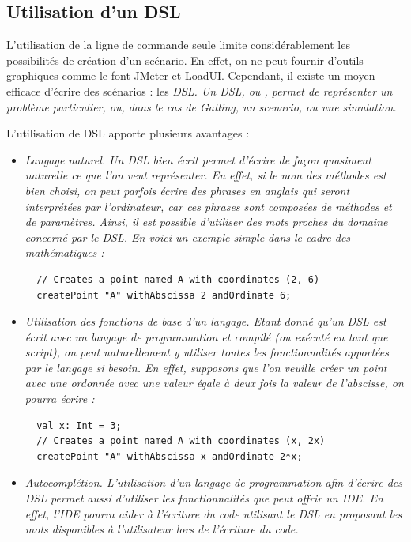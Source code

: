 \subsection{Utilisation d'un DSL}
L'utilisation de la ligne de commande seule limite considérablement les possibilités de création d'un scénario. En effet, on ne peut fournir d'outils graphiques comme le font JMeter et LoadUI. Cependant, il existe un moyen efficace d'écrire des scénarios : les \em{DSL}. Un DSL, ou , permet de représenter un problème particulier, ou, dans le cas de Gatling, un scenario, ou une simulation.

L'utilisation de DSL apporte plusieurs avantages :
\begin{itemize}
  \item \em{Langage naturel}. Un DSL bien écrit permet d'écrire de façon quasiment naturelle ce que l'on veut représenter. En effet, si le nom des méthodes est bien choisi, on peut parfois écrire des phrases en anglais qui seront interprétées par l'ordinateur, car ces phrases sont composées de méthodes et de paramètres. Ainsi, il est possible d'utiliser des mots proches du domaine concerné par le DSL. En voici un exemple simple dans le cadre des mathématiques :
  \begin{lstlisting}
  // Creates a point named A with coordinates (2, 6)
  createPoint "A" withAbscissa 2 andOrdinate 6;
  \end{lstlisting}
  \item \em{Utilisation des fonctions de base d'un langage}. Etant donné qu'un DSL est écrit avec un langage de programmation et compilé (ou exécuté en tant que script), on peut naturellement y utiliser toutes les fonctionnalités apportées par le langage si besoin. En effet, supposons que l'on veuille créer un point avec une ordonnée avec une valeur égale à deux fois la valeur de l'abscisse, on pourra écrire :
  \begin{lstlisting}
  val x: Int = 3;
  // Creates a point named A with coordinates (x, 2x)
  createPoint "A" withAbscissa x andOrdinate 2*x;
  \end{lstlisting}
  \item \em{Autocomplétion}. L'utilisation d'un langage de programmation afin d'écrire des DSL permet aussi d'utiliser les fonctionnalités que peut offrir un IDE. En effet, l'IDE pourra aider à l'écriture du code utilisant le DSL en proposant les mots disponibles à l'utilisateur lors de l'écriture du code.
\end{itemize}

